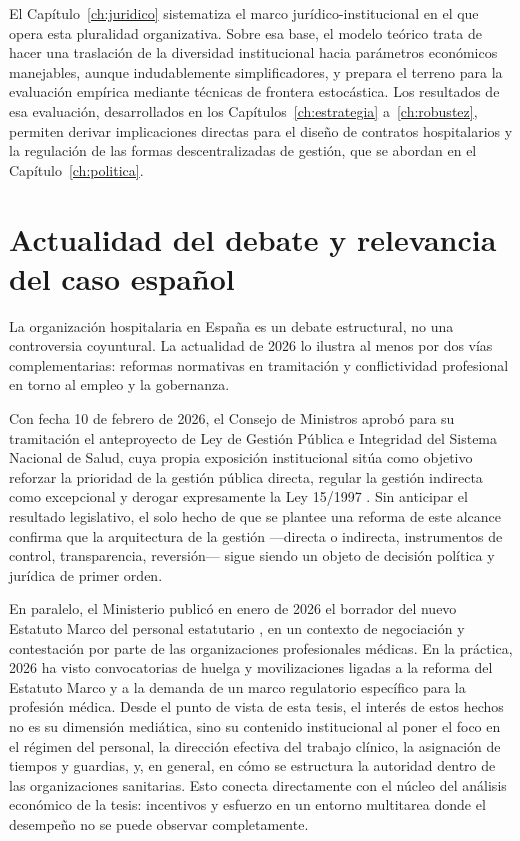 El Capítulo~\ref{ch:juridico} sistematiza el marco jurídico-institucional 
en  el que opera esta pluralidad organizativa. Sobre esa base, el 
modelo teórico trata de  hacer una traslación de  la diversidad institucional hacia  parámetros 
económicos manejables, aunque indudablemente simplificadores,  y prepara el terreno para la evaluación 
empírica mediante técnicas de frontera estocástica. Los resultados 
de esa evaluación, desarrollados en los Capítulos~\ref{ch:estrategia} 
a~\ref{ch:robustez}, permiten derivar implicaciones directas para el 
diseño de contratos hospitalarios y la regulación de las formas 
descentralizadas de gestión, que se abordan en el 
Capítulo~\ref{ch:politica}.
\section{Actualidad del debate y relevancia del caso español}

La organización hospitalaria en España es un debate estructural, no una controversia coyuntural. La actualidad de 2026 lo ilustra al menos por dos vías complementarias: reformas normativas en tramitación y conflictividad profesional en torno al empleo y la gobernanza.%


Con fecha 10 de febrero de 2026, el Consejo de Ministros aprobó para su tramitación el anteproyecto de Ley de Gestión Pública e Integridad del Sistema Nacional de Salud, cuya propia exposición institucional sitúa como objetivo  reforzar  la prioridad de la gestión pública directa, regular la gestión indirecta como excepcional y derogar expresamente la Ley 15/1997 \citep{ministerio2026gestion}. Sin anticipar el resultado legislativo, el solo hecho de que se plantee una reforma de este alcance confirma que la arquitectura de la gestión ---directa o indirecta, instrumentos de control, transparencia, reversión--- sigue siendo un objeto de decisión política y jurídica de primer orden. %

En paralelo, el Ministerio publicó en enero de 2026 el borrador del nuevo Estatuto Marco del personal estatutario \citep{ministerio2026estatuto}, en un contexto de negociación y contestación por parte de las organizaciones profesionales médicas. En la práctica, 2026 ha visto convocatorias de huelga y movilizaciones ligadas a la reforma del Estatuto Marco y a la demanda de un marco regulatorio específico para la profesión médica. Desde el punto de vista de esta tesis, el interés de estos hechos no es su dimensión mediática, sino su contenido institucional al poner el foco en el régimen del personal, la dirección efectiva del trabajo clínico, la asignación de tiempos y guardias, y, en general, en cómo se estructura la autoridad dentro de las organizaciones sanitarias. Esto conecta directamente con el núcleo del análisis económico de la tesis: incentivos y esfuerzo en un entorno multitarea donde el desempeño no se puede observar completamente.

